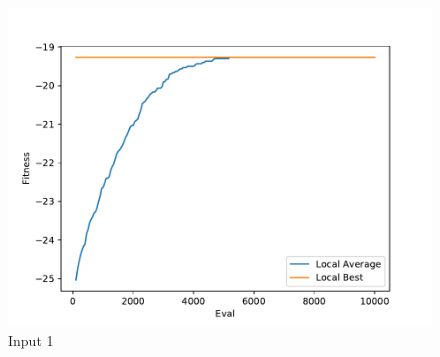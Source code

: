 \documentclass{standalone}
\begin{document}
\begin{figure}[!htb]
	\caption{Input 1}
	\label{fig:graph_1053}
	\includegraphics[width=\textwidth]{../graphs/graphs/1053.pdf}
\end{figure}
\end{document}
